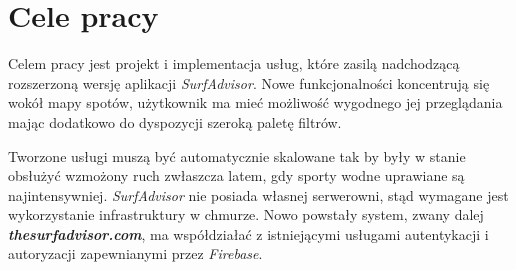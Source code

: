 \newpage

\section{Cele pracy}
Celem pracy jest projekt i implementacja usług, które zasilą nadchodzącą rozszerzoną wersję aplikacji \emph{SurfAdvisor}.
Nowe funkcjonalności koncentrują się wokół mapy spotów, użytkownik ma mieć możliwość wygodnego jej przeglądania mając dodatkowo do dyspozycji szeroką paletę filtrów.

Tworzone usługi muszą być automatycznie skalowane tak by były w stanie obsłużyć wzmożony ruch zwłaszcza latem, gdy sporty wodne uprawiane są najintensywniej.
\emph{SurfAdvisor} nie posiada własnej serwerowni, stąd wymagane jest wykorzystanie infrastruktury w chmurze.
Nowo powstały system, zwany dalej \textbf{\emph{thesurfadvisor.com}}, ma współdziałać z istniejącymi usługami autentykacji i autoryzacji zapewnianymi przez \emph{Firebase}.

